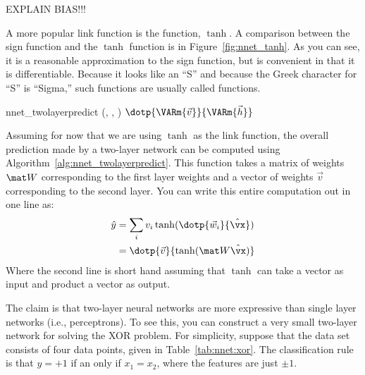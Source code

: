 EXPLAIN BIAS!!!

A more popular link function is the 
function, $\tanh$.  A comparison between the sign function and the
$\tanh$ function is in Figure~\ref{fig:nnet_tanh}.  As you can see, it
is a reasonable approximation to the sign function, but is convenient
in that it is differentiable.  Because it looks like an ``S'' and because the
Greek character for ``S'' is ``Sigma,'' such functions are usually
called  functions.

\newalgorithm%
  {nnet_twolayerpredict}%
  {(, , \VAR{$\hat\vx$})}
  {
\ENDFOR
\RETURN $\dotp{\VARm{\vec v}}{\VARm{\vec h}}$
}


Assuming for now that we are using $\tanh$ as the link function, the
overall prediction made by a two-layer network can be computed using
Algorithm~\ref{alg:nnet_twolayerpredict}.  This function takes a
matrix of weights $\mat W$ corresponding to the first layer weights
and a vector of weights $\vec v$ corresponding to the second layer.
You can write this entire computation out in one line as:
%
\begin{align}
\hat y
&= \sum_i v_i \tanh( \dotp{\vec w_i}{\hat\vx} ) \\
&= \dotp{\vec v}{\tanh( \mat W \hat\vx )} \label{eq:nnet:matrixeq}
\end{align}
%
Where the second line is short hand assuming that $\tanh$ can take a
vector as input and product a vector as output.



The claim is that two-layer neural networks are more expressive than
single layer networks (i.e., perceptrons).  To see this, you can
construct a very small two-layer network for solving the XOR problem.
For simplicity, suppose that the data set consists of four data
points, given in Table~\ref{tab:nnet:xor}.  The classification rule is
that $y=+1$ if an only if $x_1=x_2$, where the features are just $\pm
1$.

